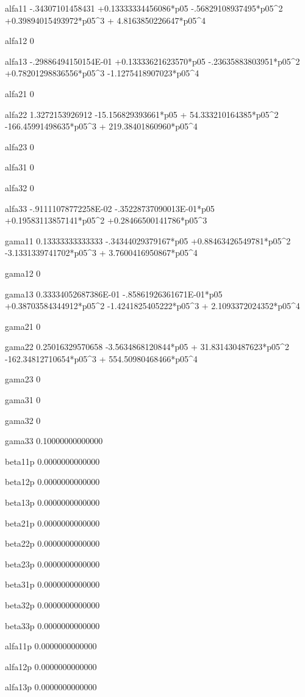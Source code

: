  alfa11 
  -.34307101458431 +0.13333334456086*p05  -.56829108937495*p05^2 +0.39894015493972*p05^3 + 4.8163850226647*p05^4 
  
 alfa12 
 0 
  
 alfa13 
  -.29886494150154E-01 +0.13333621623570*p05  -.23635883803951*p05^2 +0.78201298836556*p05^3  -1.1275418907023*p05^4 
  
 alfa21 
 0 
  
 alfa22 
   1.3272153926912  -15.156829393661*p05 + 54.333210164385*p05^2  -166.45991498635*p05^3 + 219.38401860960*p05^4 
  
 alfa23 
 0 
  
 alfa31 
 0 
  
 alfa32 
 0 
  
 alfa33 
  -.91111078772258E-02  -.35228737090013E-01*p05 +0.19583113857141*p05^2 +0.28466500141786*p05^3 
  
 gama11 
  0.13333333333333  -.34344029379167*p05 +0.88463426549781*p05^2  -3.1331339741702*p05^3 + 3.7600416950867*p05^4 
  
 gama12 
 0 
  
 gama13 
  0.33334052687386E-01  -.85861926361671E-01*p05 +0.38703584344912*p05^2  -1.4241825405222*p05^3 + 2.1093372024352*p05^4 
  
 gama21 
 0 
  
 gama22 
  0.25016329570658  -3.5634868120844*p05 + 31.831430487623*p05^2  -162.34812710654*p05^3 + 554.50980468466*p05^4 
  
 gama23 
 0 
  
 gama31 
 0 
  
 gama32 
 0 
  
 gama33 
  0.10000000000000 
  
 beta11p
   0.0000000000000 
  
 beta12p
   0.0000000000000 
  
 beta13p
   0.0000000000000 
  
 beta21p
   0.0000000000000 
  
 beta22p
   0.0000000000000 
  
 beta23p
   0.0000000000000 
  
 beta31p
   0.0000000000000 
  
 beta32p
   0.0000000000000 
  
 beta33p
   0.0000000000000 
  
 alfa11p
   0.0000000000000 
  
 alfa12p
   0.0000000000000 
  
 alfa13p
   0.0000000000000 
  
